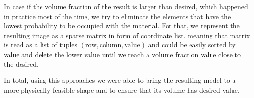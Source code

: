 In case if the volume fraction of the result is larger than desired, which happened in practice most of the time, we try to eliminate the elements that have the lowest probability to be occupied with the material.
For that, we represent the resulting image as a sparse matrix in form of coordinate list, meaning that matrix is read as a list of tuples $(\mathrm{row},\mathrm{column},\mathrm{value})$ and could be easily sorted by value and delete the lower value until we reach a volume fraction value close to the desired.
\medskip

In total, using this approaches we were able to bring the resulting model to a more physically feasible shape and to ensure that its volume has desired value.
\medskip
{}
